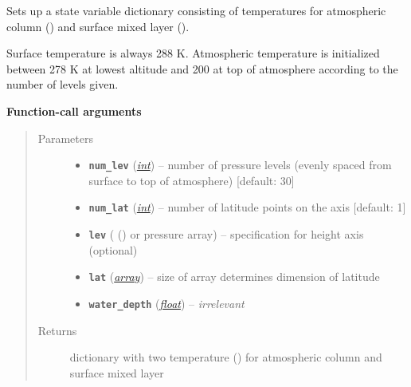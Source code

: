 \documentclass[a4paper,10pt,english]{sphinxmanual}
\begin{document}
\begin{fulllineitems}
\label{api/climlab.domain:climlab.domain.initial.column_state}
Sets up a state variable dictionary consisting of temperatures
for atmospheric column () and surface mixed layer ().

Surface temperature is always 288 K. Atmospheric temperature is initialized 
between 278 K at lowest altitude and 200 at top of atmosphere according to
the number of levels given.

\textbf{Function-call arguments}
\begin{quote}\begin{description}
\item[{Parameters}] \leavevmode\begin{itemize}
\item {} 
\textbf{\texttt{num\_lev}} (\href{http://docs.python.org/2.7/library/functions.html\#int}{\emph{int}}) -- number of pressure levels
(evenly spaced from surface to top of atmosphere) 
{[}default: 30{]}

\item {} 
\textbf{\texttt{num\_lat}} (\href{http://docs.python.org/2.7/library/functions.html\#int}{\emph{int}}) -- number of latitude points on the axis
{[}default: 1{]}

\item {} 
\textbf{\texttt{lev}} ({\hyperref[api/climlab.domain:climlab.domain.axis.Axis]{\emph{}}} () or pressure array) -- specification for height axis (optional)

\item {} 
\textbf{\texttt{lat}} (\href{http://docs.python.org/2.7/library/array.html\#module-array}{\emph{array}}) -- size of array determines dimension of latitude

\item {} 
\textbf{\texttt{water\_depth}} (\href{http://docs.python.org/2.7/library/functions.html\#float}{\emph{float}}) -- \emph{irrelevant}

\end{itemize}

\item[{Returns}] \leavevmode
dictionary with two temperature 
{\hyperref[api/climlab.domain:climlab.domain.field.Field]{\emph{}}} () 
for atmospheric column  and 
surface mixed layer 


\end{description}
\end{quote}
\end{fulllineitems}
\end{document}
